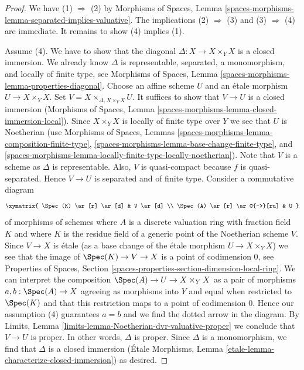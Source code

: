 \begin{proof}
We have (1) $\Rightarrow$ (2) by
Morphisms of Spaces, Lemma
\ref{spaces-morphisms-lemma-separated-implies-valuative}.
The implications (2) $\Rightarrow$ (3) and (3) $\Rightarrow$ (4)
are immediate. It remains to show (4) implies (1).

\medskip\noindent
Assume (4). We have to show that the diagonal
$\Delta : X \to X \times_Y X$ is a closed
immersion. We already know $\Delta$ is representable, separated,
a monomorphism, and locally of finite type, see Morphisms of Spaces, Lemma
\ref{spaces-morphisms-lemma-properties-diagonal}.
Choose an affine scheme $U$ and an \'etale morphism
$U \to X \times_Y X$. Set $V = X \times_{\Delta, X \times_Y X} U$.
It suffices to show that $V \to U$ is a closed immersion
(Morphisms of Spaces, Lemma
\ref{spaces-morphisms-lemma-closed-immersion-local}).
Since $X \times_Y X$ is locally of finite type over $Y$ we see that
$U$ is Noetherian (use Morphisms of Spaces, Lemmas
\ref{spaces-morphisms-lemma-composition-finite-type},
\ref{spaces-morphisms-lemma-base-change-finite-type}, and
\ref{spaces-morphisms-lemma-locally-finite-type-locally-noetherian}).
Note that $V$ is a scheme as $\Delta$ is representable.
Also, $V$ is quasi-compact because $f$ is quasi-separated.
Hence $V \to U$ is separated and of finite type. Consider a commutative diagram
$$
\xymatrix{
\Spec(K) \ar[r] \ar[d] & V \ar[d] \\
\Spec(A) \ar[r] \ar@{-->}[ru] & U
}
$$
of morphisms of schemes where $A$ is a discrete valuation ring
with fraction field $K$ and where $K$ is the residue field of
a generic point of the Noetherian scheme $V$. Since $V \to X$
is \'etale (as a base change of the \'etale morphism $U \to X \times_Y X$)
we see that the image of $\Spec(K) \to V \to X$ is a point of
codimension $0$, see Properties of Spaces, Section
\ref{spaces-properties-section-dimension-local-ring}.
We can interpret the composition $\Spec(A) \to U \to X \times_Y X$
as a pair of morphisms $a, b : \Spec(A) \to X$ agreeing as morphisms
into $Y$ and equal when restricted to $\Spec(K)$ and that this
restriction maps to a point of codimension $0$. Hence our assumption
(4) guarantees $a = b$ and we find the dotted arrow in the diagram.
By Limits, Lemma \ref{limits-lemma-Noetherian-dvr-valuative-proper}
we conclude that $V \to U$ is proper. In other words, $\Delta$ is proper.
Since $\Delta$ is a monomorphism, we find that $\Delta$ is a
closed immersion (\'Etale Morphisms, Lemma
\ref{etale-lemma-characterize-closed-immersion}) as desired.
\end{proof}

